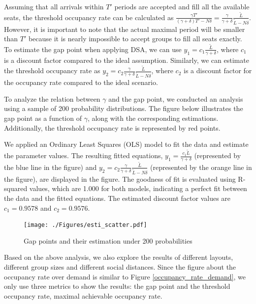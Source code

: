 Assuming that all arrivals within $T'$ periods are accepted and fill all the available seats, the threshold occupancy rate can be calculated as $\frac{\gamma T'}{(\gamma+ \delta)T' - N \delta} = \frac{\gamma}{\gamma +\delta} \frac{\tilde{L}}{\tilde{L}-N \delta}$. However, it is important to note that the actual maximal period will be smaller than $T{'}$ because it is nearly impossible to accept groups to fill all seats exactly. To estimate the gap point when applying DSA, we can use $y_1 = c_1 \frac{\tilde{L}}{\gamma + \delta}$, where $c_1$ is a discount factor compared to the ideal assumption. Similarly, we can estimate the threshold occupancy rate as $y_2 = c_2 \frac{\gamma}{\gamma +\delta} \frac{\tilde{L}}{\tilde{L}-N \delta}$, where $c_2$ is a discount factor for the occupancy rate compared to the ideal scenario.

To analyze the relation between $\gamma$ and the gap point, we conducted an analysis using a sample of 200 probability distributions. The figure below illustrates the gap point as a function of $\gamma$, along with the corresponding estimations.  Additionally, the threshold occupancy rate is represented by red points. 

We applied an Ordinary Least Squares (OLS) model to fit the data and estimate the parameter values. The resulting fitted equations, $y_1 = \frac{c_1 \tilde{L}}{\gamma + \delta}$ (represented by the blue line in the figure) and $y_2 = c_2 \frac{\gamma}{\gamma + \delta} \frac{\tilde{L}}{\tilde{L}-N \delta}$ (represented by the orange line in the figure), are displayed in the figure. The goodness of fit is evaluated using R-squared values, which are 1.000 for both models, indicating a perfect fit between the data and the fitted equations. The estimated discount factor values are $c_1 = 0.9578$ and $c_2 = 0.9576$.

\begin{figure}[ht]
  \centering
    \texttt{[image: ./Figures/esti\_scatter.pdf]}
  \caption{Gap points and their estimation under 200 probabilities}
\end{figure}


Based on the above analysis, we also explore the results of different layouts, different group sizes and different social distances. Since the figure about the occupancy rate over demand is similar to Figure \ref{occupancy_rate_demand}, we only use three metrics to show the results: the gap point and the threshold occupancy rate, maximal achievable occupancy rate.

